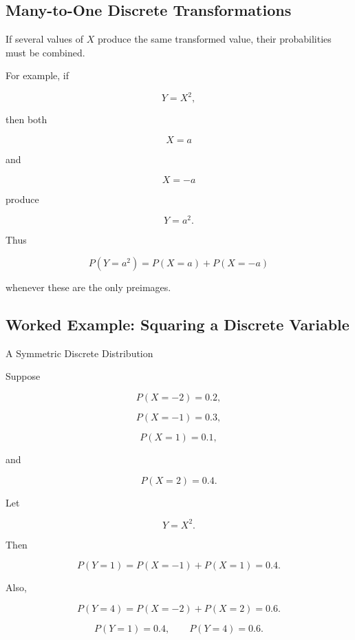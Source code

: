 \subsection{Many-to-One Discrete Transformations}
\label{subsec:many-to-one-discrete-transformations}

If several values of \(X\) produce the same transformed value, their
probabilities must be combined.

For example, if

\[
Y=X^2,
\]

then both

\[
X=a
\]

and

\[
X=-a
\]

produce

\[
Y=a^2.
\]

Thus

\[
\boxed{
P(Y=a^2)
=
P(X=a)+P(X=-a)
}
\]

whenever these are the only preimages.

\subsection{Worked Example: Squaring a Discrete Variable}
\label{subsec:worked-square-discrete}

\begin{workedexamplebox}{A Symmetric Discrete Distribution}

Suppose

\[
P(X=-2)=0.2,
\]

\[
P(X=-1)=0.3,
\]

\[
P(X=1)=0.1,
\]

and

\[
P(X=2)=0.4.
\]

Let

\[
Y=X^2.
\]

Then

\[
P(Y=1)
=
P(X=-1)+P(X=1)
=
0.4.
\]

Also,

\[
P(Y=4)
=
P(X=-2)+P(X=2)
=
0.6.
\]

\begin{answerbox}
\[
\boxed{
P(Y=1)=0.4,
\qquad
P(Y=4)=0.6.
}
\]
\end{answerbox}

\end{workedexamplebox}

